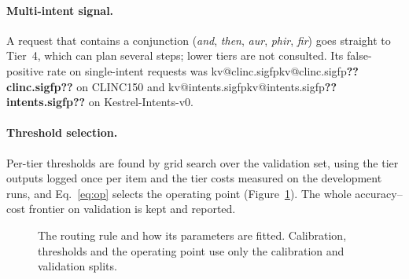 \documentclass[11pt,a4paper]{article}
\makeatletter
\DeclareRobustCommand{\kv}[1]{\ifcsname kv@#1\endcsname\csname kv@#1\endcsname\else\textbf{??#1??}\fi}
\makeatother
\begin{document}
\paragraph{Multi-intent signal.} A request that contains a conjunction (\emph{and}, \emph{then}, \emph{aur},
\emph{phir}, \emph{fir}) goes straight to Tier~4, which can plan several steps; lower tiers are not consulted. Its
false-positive rate on single-intent requests was \kv{clinc.sigfp} on CLINC150 and \kv{intents.sigfp} on
Kestrel-Intents-v0.

\paragraph{Threshold selection.} Per-tier thresholds are found by grid search over the validation set, using the tier
outputs logged once per item and the tier costs measured on the development runs, and Eq.~\eqref{eq:op} selects the
operating point (Figure~\ref{fig:algo}). The whole accuracy--cost frontier on validation is kept and reported.

\begin{figure}[t]
\centering
{}
\caption{The routing rule and how its parameters are fitted. Calibration, thresholds and the operating point use only
the calibration and validation splits.}
\label{fig:algo}
\end{figure}
\end{document}
